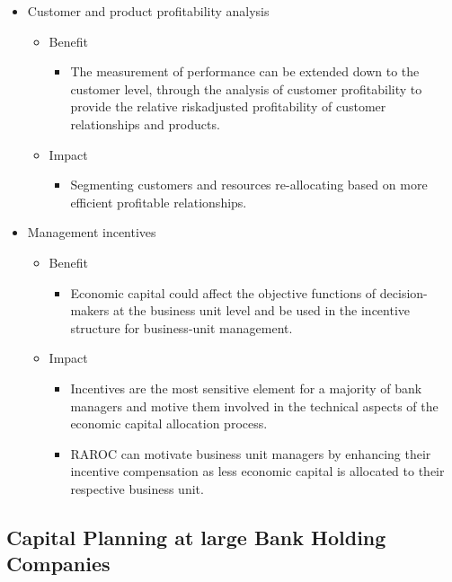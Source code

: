 \begin{itemize}
\item Customer and product profitability analysis
    \begin{itemize}
    \item Benefit
        \begin{itemize}
        \item The measurement of performance can be extended down to the customer level, through the analysis of customer profitability to provide the relative riskadjusted profitability of customer relationships and
        products.
        \end{itemize}
    \item Impact
        \begin{itemize}
        \item Segmenting customers and resources re-allocating based on more efficient profitable relationships.
        \end{itemize}
    \end{itemize}
\item Management incentives
    \begin{itemize}
    \item Benefit
        \begin{itemize}
        \item Economic capital could affect the objective functions of decision-makers at the business unit level and be used in the incentive structure for business-unit management.
        \end{itemize}
    \item Impact
        \begin{itemize}
        \item Incentives are the most sensitive element for a majority of bank managers and motive them involved in the technical aspects of the economic capital allocation process.
        \item RAROC can motivate business unit managers by enhancing their incentive compensation as less economic capital is allocated to their respective business unit.
        \end{itemize}
    \end{itemize}
    
\end{itemize}


\subsection{Capital Planning at large Bank Holding Companies}



